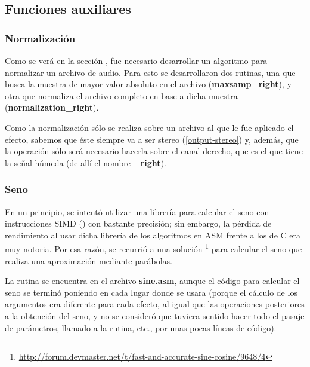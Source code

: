 \subsection{Funciones auxiliares}
\label{subsec:desarrollo-auxiliares}

\subsubsection{Normalización}
\label{subsec:desarrollo-normalizacion}
Como se verá en la sección , fue necesario desarrollar un algoritmo para normalizar un archivo de audio. Para esto se desarrollaron dos rutinas, una que busca la muestra de mayor valor absoluto en el archivo (\textbf{maxsamp\_right}), y otra que normaliza el  archivo completo en base a dicha muestra (\textbf{normalization\_right}).

Como la normalización sólo se realiza sobre un archivo al que le fue aplicado el efecto, sabemos que éste siempre va a ser stereo (\ref{output-stereo}) y, además, que la operación sólo será necesario hacerla sobre el canal derecho, que es el que tiene la señal húmeda (de allí el nombre \textbf{\_right}).

\subsubsection{Seno}
\label{subsec:desarrollo-seno}
En un principio, se intentó utilizar una librería para calcular el seno con instrucciones SIMD () con bastante precisión; sin embargo, la pérdida de rendimiento al usar dicha librería de los algoritmos en ASM frente a los de C era muy notoria. Por esa razón, se recurrió a una solución \footnote{\url{http://forum.devmaster.net/t/fast-and-accurate-sine-cosine/9648/4}} para calcular el seno que realiza una aproximación mediante parábolas.

La rutina se encuentra en el archivo \textbf{sine.asm}, aunque el código para calcular el seno se terminó poniendo en cada lugar donde se usara (porque el cálculo de los argumentos era diferente para cada efecto, al igual que las operaciones posteriores a la obtención del seno, y no se consideró que tuviera sentido hacer todo el pasaje de parámetros, llamado a la rutina, etc., por unas pocas líneas de código).